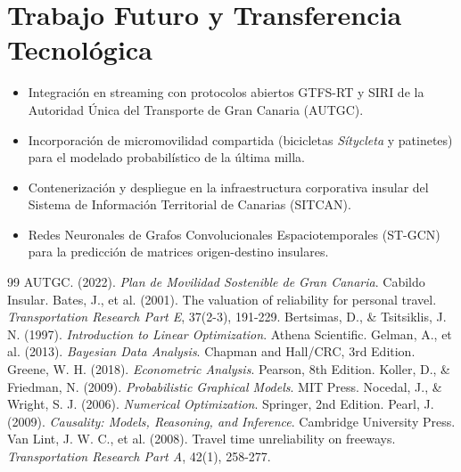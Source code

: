 \documentclass[11pt,a4paper,twoside]{report}
\begin{document}
\section{Trabajo Futuro y Transferencia Tecnológica}
\begin{itemize}
    \item Integración en streaming con protocolos abiertos GTFS-RT y SIRI de la Autoridad Única del Transporte de Gran Canaria (AUTGC).
    \item Incorporación de micromovilidad compartida (bicicletas \textit{Sítycleta} y patinetes) para el modelado probabilístico de la última milla.
    \item Contenerización y despliegue en la infraestructura corporativa insular del Sistema de Información Territorial de Canarias (SITCAN).
    \item Redes Neuronales de Grafos Convolucionales Espaciotemporales (ST-GCN) para la predicción de matrices origen-destino insulares.
\end{itemize}

\begin{thebibliography}{99}
 AUTGC. (2022). \textit{Plan de Movilidad Sostenible de Gran Canaria}. Cabildo Insular.
 Bates, J., et al. (2001). The valuation of reliability for personal travel. \textit{Transportation Research Part E}, 37(2-3), 191-229.
 Bertsimas, D., \& Tsitsiklis, J. N. (1997). \textit{Introduction to Linear Optimization}. Athena Scientific.
 Gelman, A., et al. (2013). \textit{Bayesian Data Analysis}. Chapman and Hall/CRC, 3rd Edition.
 Greene, W. H. (2018). \textit{Econometric Analysis}. Pearson, 8th Edition.
 Koller, D., \& Friedman, N. (2009). \textit{Probabilistic Graphical Models}. MIT Press.
 Nocedal, J., \& Wright, S. J. (2006). \textit{Numerical Optimization}. Springer, 2nd Edition.
 Pearl, J. (2009). \textit{Causality: Models, Reasoning, and Inference}. Cambridge University Press.
 Van Lint, J. W. C., et al. (2008). Travel time unreliability on freeways. \textit{Transportation Research Part A}, 42(1), 258-277.
\end{thebibliography}
\end{document}
